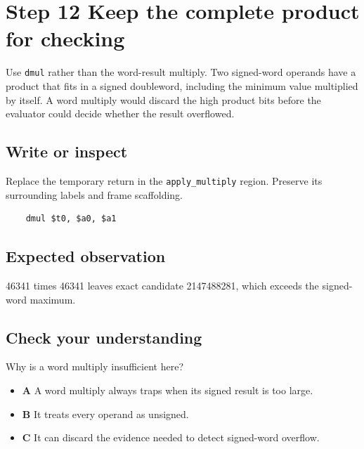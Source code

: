 \section{Step 12 Keep the complete product for checking}\label{expression-s12}

Use \texttt{dmul} rather than the word-result multiply. Two signed-word operands have a product that fits in a signed doubleword, including the minimum value multiplied by itself. A word multiply would discard the high product bits before the evaluator could decide whether the result overflowed.

\subsection{Write or inspect}
Replace the temporary return in the \texttt{apply\_multiply} region. Preserve its surrounding labels and frame scaffolding.

\begin{verbatim}
    dmul $t0, $a0, $a1
\end{verbatim}
\subsection{Expected observation}
46341 times 46341 leaves exact candidate 2147488281, which exceeds the signed-word maximum.

\subsection{Check your understanding}
Why is a word multiply insufficient here?

\begin{itemize}
  \item \textbf{A} A word multiply always traps when its signed result is too large.
  \item \textbf{B} It treats every operand as unsigned.
  \item \textbf{C} It can discard the evidence needed to detect signed-word overflow.
\end{itemize}
